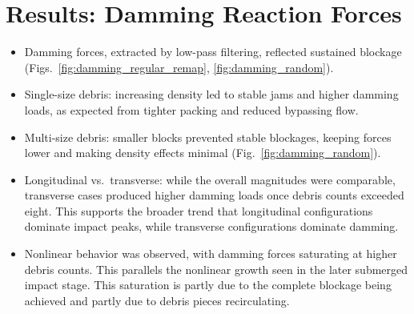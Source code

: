 \documentclass{article}
\begin{document}
\section{Results: Damming Reaction Forces}
\begin{itemize}
    \item Damming forces, extracted by low-pass filtering, reflected sustained blockage (Figs.~\ref{fig:damming_regular_remap}, \ref{fig:damming_random}).
    \item Single-size debris: increasing density led to stable jams and higher damming loads, as expected from tighter packing and reduced bypassing flow.
    \item Multi-size debris: smaller blocks prevented stable blockages, keeping forces lower and making density effects minimal (Fig.~\ref{fig:damming_random}).
    \item Longitudinal vs.\ transverse: while the overall magnitudes were comparable, transverse cases produced higher damming loads once debris counts exceeded eight. This supports the broader trend that longitudinal configurations dominate impact peaks, while transverse configurations dominate damming.
    \item Nonlinear behavior was observed, with damming forces saturating at higher debris counts. This parallels the nonlinear growth seen in the later submerged impact stage. This saturation is partly due to the complete blockage being achieved and partly due to debris pieces recirculating.
\end{itemize}

\end{document}
